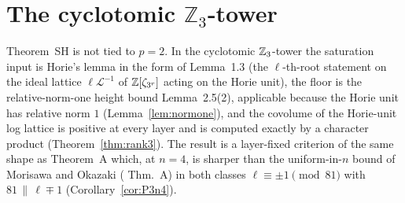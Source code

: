 \documentclass[11pt]{amsart}
\theoremstyle{remark}\newtheorem{remark}[theorem]{Remark}
\theoremstyle{definition}\newtheorem{definition}[theorem]{Definition}
\theoremstyle{definition}\newtheorem{algorithm}[theorem]{Algorithm}
\begin{document}
\section{The cyclotomic $\mathbb{Z}_3$-tower}\label{sec:p3}
Theorem~SH is not tied to $p=2$. In the cyclotomic $\mathbb{Z}_3$-tower the saturation input is Horie's lemma in the form of \cite{MO13} Lemma~1.3 (the $\ell$-th-root statement on the ideal lattice $\ell\mathcal L^{-1}$ of $\mathbb{Z}[\zeta_{3^r}]$ acting on the Horie unit), the floor is the relative-norm-one height bound \cite{MO16} Lemma~2.5(2), applicable because the Horie unit has relative norm $1$ (Lemma~\ref{lem:normone}), and the covolume of the Horie-unit log lattice is positive at every layer and is computed exactly by a character product (Theorem~\ref{thm:rank3}). The result is a layer-fixed criterion of the same shape as Theorem~A which, at $n=4$, is sharper than the uniform-in-$n$ bound of Morisawa and Okazaki (\cite{MO16} Thm.~A) in both classes $\ell\equiv\pm1\pmod{81}$ with $81\,\|\,\ell\mp1$ (Corollary~\ref{cor:P3n4}).
\end{document}

